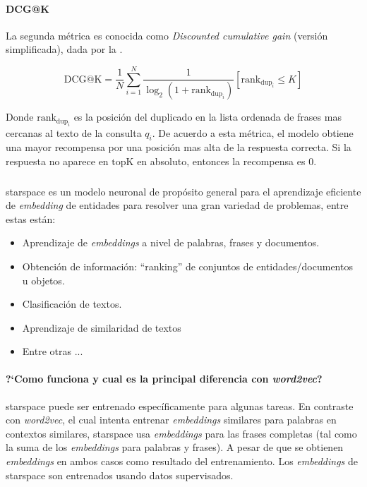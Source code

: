 \paragraph{DCG@K}
La segunda métrica es conocida como \emph{Discounted cumulative gain} (versión simplificada), dada por la .

\begin{equation} \label{eq:dcg-k}
  \mathrm{DCG@K} = \frac{1}{N} \sum_{i=1}^{N} \frac{1}{\log_2(1+\mathrm{rank}_{\mathrm{dup}_i})} [\mathrm{rank}_{\mathrm{dup}_i} \le K]
\end{equation}

Donde $\mathrm{rank}_{\mathrm{dup}_i}$ es la posición del duplicado en la lista ordenada de frases mas cercanas al texto de la consulta $q_i$. De acuerdo a esta métrica, el modelo obtiene una mayor recompensa por una posición mas alta de la respuesta correcta. Si la respuesta no aparece en $\mathrm{topK}$ en absoluto, entonces la recompensa es $0$.

\subsubsection{}
\gls{starspace} \cite{starspace} es un modelo neuronal de propósito general para el aprendizaje eficiente de \emph{embedding} de entidades para resolver una gran variedad de problemas, entre estas están:
\begin{itemize}
\item Aprendizaje de \emph{embeddings} a nivel de palabras, frases y documentos.
\item Obtención de información: ``ranking'' de conjuntos de entidades/documentos u objetos.
\item Clasificación de textos.
\item Aprendizaje de similaridad de textos
\item Entre otras ...
\end{itemize}

\paragraph{?`Como funciona y cual es la principal diferencia con \emph{word2vec}?}
\gls{starspace} puede ser entrenado específicamente para algunas tareas. En contraste con \emph{word2vec}, el cual intenta entrenar \emph{embeddings} similares para palabras en contextos similares, \gls{starspace} usa \emph{embeddings} para las frases completas (tal como la suma de los \emph{embeddings} para palabras y frases). A pesar de que se obtienen \emph{embeddings} en ambos casos como resultado del entrenamiento. Los \emph{embeddings} de \gls{starspace} son entrenados usando datos supervisados.


